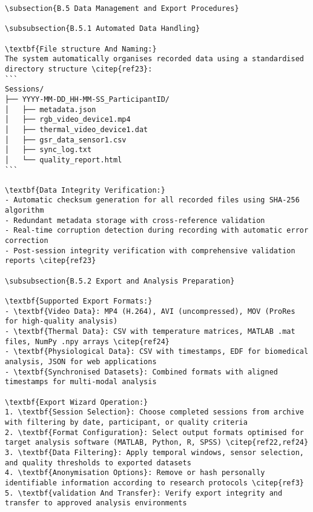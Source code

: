 \begin{verbatim}
\subsection{B.5 Data Management and Export Procedures}

\subsubsection{B.5.1 Automated Data Handling}

\textbf{File structure And Naming:}
The system automatically organises recorded data using a standardised directory structure \citep{ref23}:
```
Sessions/
├── YYYY-MM-DD_HH-MM-SS_ParticipantID/
│   ├── metadata.json
│   ├── rgb_video_device1.mp4
│   ├── thermal_video_device1.dat
│   ├── gsr_data_sensor1.csv
│   ├── sync_log.txt
│   └── quality_report.html
```

\textbf{Data Integrity Verification:}
- Automatic checksum generation for all recorded files using SHA-256 algorithm
- Redundant metadata storage with cross-reference validation
- Real-time corruption detection during recording with automatic error correction
- Post-session integrity verification with comprehensive validation reports \citep{ref23}

\subsubsection{B.5.2 Export and Analysis Preparation}

\textbf{Supported Export Formats:}
- \textbf{Video Data}: MP4 (H.264), AVI (uncompressed), MOV (ProRes for high-quality analysis)
- \textbf{Thermal Data}: CSV with temperature matrices, MATLAB .mat files, NumPy .npy arrays \citep{ref24}
- \textbf{Physiological Data}: CSV with timestamps, EDF for biomedical analysis, JSON for web applications
- \textbf{Synchronised Datasets}: Combined formats with aligned timestamps for multi-modal analysis

\textbf{Export Wizard Operation:}
1. \textbf{Session Selection}: Choose completed sessions from archive with filtering by date, participant, or quality criteria
2. \textbf{Format Configuration}: Select output formats optimised for target analysis software (MATLAB, Python, R, SPSS) \citep{ref22,ref24}
3. \textbf{Data Filtering}: Apply temporal windows, sensor selection, and quality thresholds to exported datasets
4. \textbf{Anonymisation Options}: Remove or hash personally identifiable information according to research protocols \citep{ref3}
5. \textbf{validation And Transfer}: Verify export integrity and transfer to approved analysis environments


\end{verbatim}
